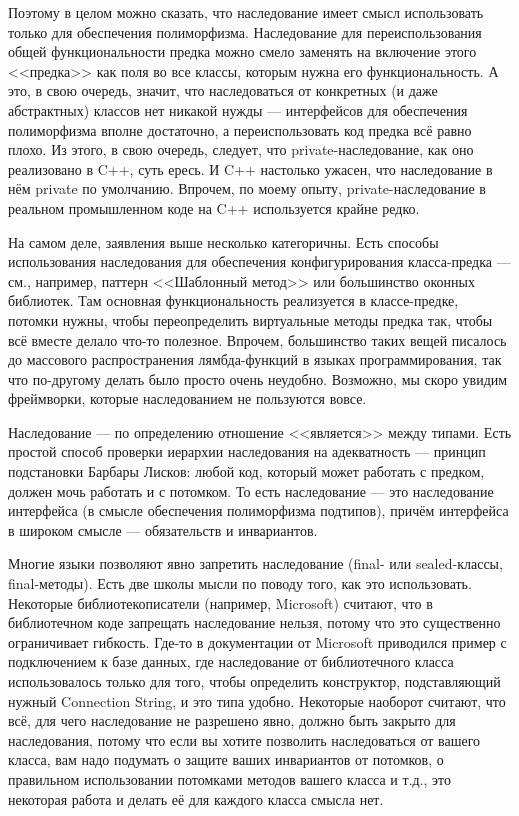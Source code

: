 \documentclass[a5paper]{article}
\begin{document}
Поэтому в целом можно сказать, что наследование имеет смысл использовать только для обеспечения полиморфизма. Наследование для переиспользования общей функциональности предка можно смело заменять на включение этого <<предка>> как поля во все классы, которым нужна его функциональность. А это, в свою очередь, значит, что наследоваться от конкретных (и даже абстрактных) классов нет никакой нужды --- интерфейсов для обеспечения полиморфизма вполне достаточно, а переиспользовать код предка всё равно плохо. Из этого, в свою очередь, следует, что private-наследование, как оно реализовано в C++, суть ересь. И C++ настолько ужасен, что наследование в нём private по умолчанию. Впрочем, по моему опыту, private-наследование в реальном промышленном коде на C++ используется крайне редко.

На самом деле, заявления выше несколько категоричны. Есть способы использования наследования для обеспечения конфигурирования класса-предка --- см., например, паттерн <<Шаблонный метод>> или большинство оконных библиотек. Там основная функциональность реализуется в классе-предке, потомки нужны, чтобы переопределить виртуальные методы предка так, чтобы всё вместе делало что-то полезное. Впрочем, большинство таких вещей писалось до массового распространения лямбда-функций в языках программирования, так что по-другому делать было просто очень неудобно. Возможно, мы скоро увидим фреймворки, которые наследованием не пользуются вовсе.

Наследование --- по определению отношение <<является>> между типами. Есть простой способ проверки иерархии наследования на адекватность --- принцип подстановки Барбары Лисков: любой код, который может работать с предком, должен мочь работать и с потомком. То есть наследование --- это наследование интерфейса (в смысле обеспечения полиморфизма подтипов), причём интерфейса в широком смысле --- обязательств и инвариантов.

Многие языки позволяют явно запретить наследование (final- или sealed-классы, final-методы). Есть две школы мысли по поводу того, как это использовать. Некоторые библиотекописатели (например, Microsoft) считают, что в библиотечном коде запрещать наследование нельзя, потому что это существенно ограничивает гибкость. Где-то в документации от Microsoft приводился пример с подключением к базе данных, где наследование от библиотечного класса использовалось только для того, чтобы определить конструктор, подставляющий нужный Connection String, и это типа удобно. Некоторые наоборот считают, что всё, для чего наследование не разрешено явно, должно быть закрыто для наследования, потому что если вы хотите позволить наследоваться от вашего класса, вам надо подумать о защите ваших инвариантов от потомков, о правильном использовании потомками методов вашего класса и т.д., это некоторая работа и делать её для каждого класса смысла нет.
\end{document}
